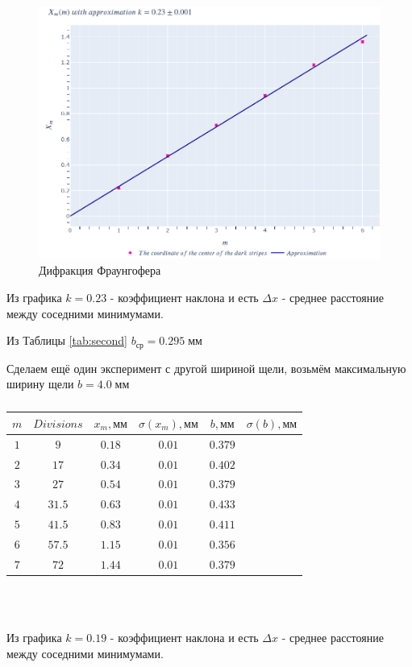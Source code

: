 \documentclass[a4paper, 12pt]{article}
\begin{document}
\begin{figure}[H]
    \centering
    \includegraphics[width=1\textwidth]{Fraunhofer.png}
    \caption{Дифракция Фраунгофера}
    \label{fig:plot1}
\end{figure}

Из графика  $k = 0.23$ - коэффициент наклона и есть $\Delta x$ - среднее расстояние между соседними минимумами.

Из Таблицы \ref{tab:second} $b_{\text{ср}} = 0.295\; \text{мм}$ 

Сделаем ещё один эксперимент с другой шириной щели, возьмём максимальную ширину щели $b = 4.0\; \text{мм}$

\begin{table}[H]
\begin{center}
\begin{tabular}{|c|c|c|c|c|c|}\hline
$m$ & $Divisions$ & $x_m, \text{мм}$ & $\sigma(x_m), \text{мм}$ & $b, \text{мм}$ & $\sigma(b), \text{мм}$\\\hline
$1$ & $9$  & $0.18$ & $0.01$ & $ 0.379$\\\hline
$2$ & $17$ & $0.34$ & $0.01$ & $0.402$\\\hline
$3$ & $27$ & $0.54$ & $0.01$ & $0.379$\\\hline
$4$ & $31.5$ & $0.63$ & $0.01$ & $0.433$\\\hline
$5$ & $41.5$ & $0.83$ & $0.01$ & $0.411$\\\hline
$6$ & $57.5$ & $1.15$ & $0.01$ & $0.356$\\\hline
$7$ & $72$ & $1.44$ & $0.01$ & $0.379$\\\hline
\end{tabular}\\~\\
\end{center}
\caption{\label{tab:third}}
\end{table}
Из графика  $k = 0.19$ - коэффициент наклона и есть $\Delta x$ - среднее расстояние между соседними минимумами.
\end{document}

